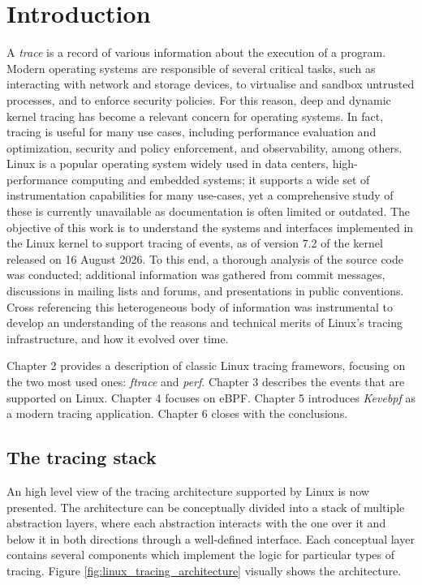 \chapter{Introduction}

A \textit{trace} is a record of various information about the execution of a
program. Modern operating systems are responsible of several critical tasks,
such as interacting with network and storage devices, to virtualise and sandbox
untrusted processes, and to enforce security policies. For this reason, deep and
dynamic kernel tracing has become a relevant concern for operating systems. In
fact, tracing is useful for many use cases, including performance evaluation and
optimization, security and policy enforcement, and observability, among others.
Linux is a popular operating system widely used in data centers,
high-performance computing and embedded systems; it supports a wide set of
instrumentation capabilities for many use-cases, yet a comprehensive study of
these is currently unavailable as documentation is often limited or outdated.
The objective of this work is to understand the systems and interfaces
implemented in the Linux kernel to support tracing of events, as of version 7.2
of the kernel released on 16 August 2026. To this end, a thorough analysis of
the source code was conducted; additional information was gathered from commit
messages, discussions in mailing lists and forums, and presentations in public
conventions. Cross referencing this heterogeneous body of information was
instrumental to develop an understanding of the reasons and technical merits of
Linux's tracing infrastructure, and how it evolved over time.

Chapter 2 provides a description of classic Linux tracing framewors, focusing on
the two most used ones: \textit{ftrace} and \textit{perf}. Chapter 3 describes
the events that are supported on Linux. Chapter 4 focuses on eBPF. Chapter 5
introduces \textit{Kevebpf} as a modern tracing application. Chapter 6 closes
with the conclusions.

\section{The tracing stack}

An high level view of the tracing architecture supported by Linux is now
presented. The architecture can be conceptually divided into a stack of multiple
abstraction layers, where each abstraction interacts with the one over it and
below it in both directions through a well-defined interface. Each conceptual
layer contains several components which implement the logic for particular types
of tracing. Figure \ref{fig:linux_tracing_architecture} visually shows the
architecture.

